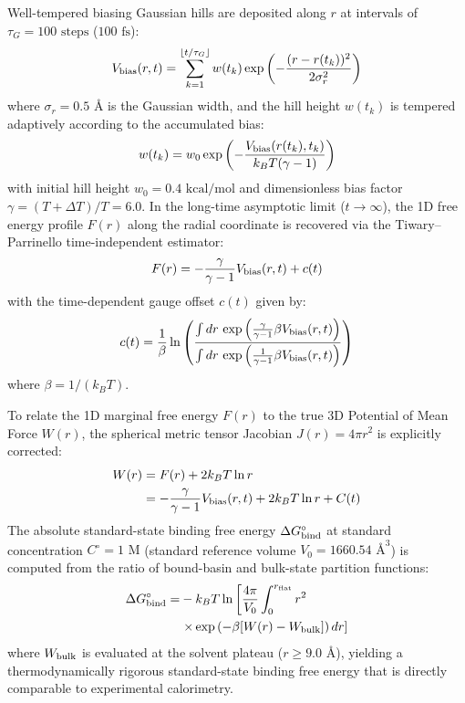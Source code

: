 \documentclass[journal=jpcbfk,manuscript=article]{achemso}
\begin{document}
Well-tempered biasing Gaussian hills are deposited along $r$ at intervals of $\tau_G = 100\text{ steps}$ ($100\text{ fs}$):
\begin{equation}
V_{\rm bias}(r, t) = \sum_{k=1}^{\lfloor t/\tau_G \rfloor} w(t_k) \exp\left( - \frac{(r - r(t_k))^2}{2 \sigma_r^2} \right)
\end{equation}
where $\sigma_r = 0.5\text{ \AA}$ is the Gaussian width, and the hill height $w(t_k)$ is tempered adaptively according to the accumulated bias:
\begin{equation}
w(t_k) = w_0 \exp\left( - \frac{V_{\rm bias}(r(t_k), t_k)}{k_B T (\gamma - 1)} \right)
\end{equation}
with initial hill height $w_0 = 0.4\text{ kcal/mol}$ and dimensionless bias factor $\gamma = (T + \Delta T)/T = 6.0$. In the long-time asymptotic limit ($t \to \infty$), the 1D free energy profile $F(r)$ along the radial coordinate is recovered via the Tiwary--Parrinello time-independent estimator:\cite{tiwary2015time}
\begin{equation}
F(r) = - \frac{\gamma}{\gamma - 1} V_{\rm bias}(r, t) + c(t)
\end{equation}
with the time-dependent gauge offset $c(t)$ given by:
\begin{equation}
c(t) = \frac{1}{\beta} \ln \left( \frac{\int dr \, \exp\left( \frac{\gamma}{\gamma - 1} \beta V_{\rm bias}(r, t) \right)}{\int dr \, \exp\left( \frac{1}{\gamma - 1} \beta V_{\rm bias}(r, t) \right)} \right)
\end{equation}
where $\beta = 1/(k_B T)$.

To relate the 1D marginal free energy $F(r)$ to the true 3D Potential of Mean Force $W(r)$, the spherical metric tensor Jacobian $J(r) = 4\pi r^2$ is explicitly corrected:\cite{tiwary2015time,boresch2003absolute}
\begin{align}
W(r) &= F(r) + 2 k_B T \ln r \nonumber \\
&= - \frac{\gamma}{\gamma - 1} V_{\rm bias}(r, t) + 2 k_B T \ln r + C(t)
\end{align}
The absolute standard-state binding free energy $\Delta G^\circ_{\rm bind}$ at standard concentration $C^\circ = 1\text{ M}$ (standard reference volume $V_0 = 1660.54\text{ \AA}^3$) is computed from the ratio of bound-basin and bulk-state partition functions:\cite{boresch2003absolute,limongelli2013funnel}
\begin{align}
\Delta G^\circ_{\rm bind} = &- k_B T \ln \left[ \frac{4\pi}{V_0} \int_0^{r_{\rm flat}} r^2 \right. \nonumber \\
&\left. \times \exp\left( -\beta [W(r) - W_{\rm bulk}] \right) dr \right]
\end{align}
where $W_{\rm bulk}$ is evaluated at the solvent plateau ($r \ge 9.0\text{ \AA}$), yielding a thermodynamically rigorous standard-state binding free energy that is directly comparable to experimental calorimetry.
\end{document}
